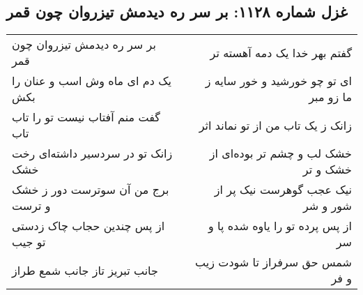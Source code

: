 \begin{center}
\section*{غزل شماره ۱۱۲۸: بر سر ره دیدمش تیزروان چون قمر}
\label{sec:1128}
\begin{longtable}{l p{0.5cm} r}
بر سر ره دیدمش تیزروان چون قمر
&&
گفتم بهر خدا یک دمه آهسته تر
\\
یک دم ای ماه وش اسب و عنان را بکش
&&
ای تو چو خورشید و خور سایه ز ما زو مبر
\\
گفت منم آفتاب نیست تو را تاب تاب
&&
زانک ز یک تاب من از تو نماند اثر
\\
زانک تو در سردسیر داشته‌ای رخت خشک
&&
خشک لب و چشم تر بوده‌ای از خشک و تر
\\
برج من آن سوترست دور ز خشک و ترست
&&
نیک عجب گوهرست نیک پر از شور و شر
\\
از پس چندین حجاب چاک زدستی تو جیب
&&
از پس پرده تو را یاوه شده پا و سر
\\
جانب تبریز تاز جانب شمع طراز
&&
شمس حق سرفراز تا شودت زیب و فر
\\
\end{longtable}
\end{center}
